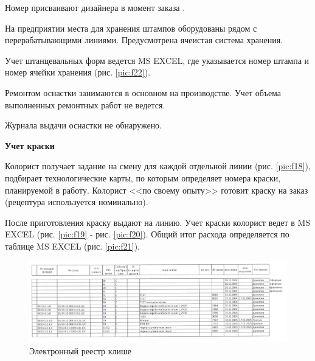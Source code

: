 Номер присваивают дизайнера в момент заказа .

На предприятии места для хранения штампов оборудованы рядом с перерабатывающими линиями. Предусмотрена ячеистая система хранения. 

Учет штанцевальных форм ведется MS EXCEL, где указывается номер штампа и номер ячейки хранения (рис. \ref{pic:f22}).

Ремонтом оснастки занимаются в основном на производстве. Учет объема выполненных ремонтных работ не ведется.


Журнала выдачи оснастки не обнаружено.












\textbf{Учет краски}

Колорист получает задание на смену для каждой отдельной линии (рис. \ref{pic:f18}), подбирает технологические карты, по которым определяет номера краски, планируемой в работу. Колорист <<по своему опыту>> готовит краску на заказ (рецептура используется номинально). 

После приготовления краску выдают на линию. Учет краски колорист ведет в MS EXCEL (рис. \ref{pic:f19} - рис. \ref{pic:f20}). Общий итог расхода определяется по таблице MS EXCEL (рис. \ref{pic:f21}).

\begin{figure}
\begin{center}
 \includegraphics[width=\linewidth, height=0.94\textheight, angle=90, keepaspectratio]{Pics/f17.jpg}
\end{center}
\caption{Электронный реестр клише}
\label{pic:f17}
\end{figure}


